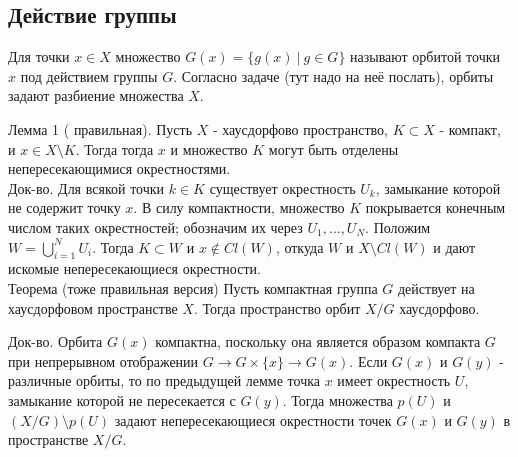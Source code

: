 \subsection{Действие группы}


Для точки $x\in X$ множество $G(x) = \{g(x)\ |\ g\in G\}$ называют орбитой точки $x$ под действием группы $G.$
Согласно задаче (тут надо на неё послать), орбиты задают разбиение множества $X.$ \


Лемма 1 ( правильная).  Пусть $X$ - хаусдорфово пространство, $K\subset X$ - компакт, и $x\in X\setminus K.$ Тогда тогда $x$ и множество $K$ могут быть отделены непересекающимися окрестностями.\\

Док-во. Для всякой точки $k\in K$ существует окрестность $U_{k}$, замыкание которой не содержит точку $x.$ В силу компактности, множество $K$ покрывается конечным числом таких окрестностей; обозначим их
через $U_{1},\ldots, U_{N}$. Положим $W = \bigcup_{i=1}^{N} U_{i}$. Тогда $K\subset W$ и $x\notin Cl(W)$, откуда $W$ и $X\setminus Cl(W)$ и дают искомые непересекающиеся окрестности.\\



Теорема (тоже правильная версия) Пусть компактная группа $G$ действует на хаусдорфовом пространстве $X.$
Тогда пространство орбит $X/G$ хаусдорфово.

Док-во.  Орбита $G(x)$ компактна, поскольку она является образом компакта $G$ при непрерывном отображении
$G \to G\times \{x\} \to G(x).$ Если $G(x)$ и $G(y)$ - различные орбиты, то по предыдущей лемме точка $x$ имеет окрестность $U$, замыкание которой не пересекается с $G(y).$
Тогда множества $p(U)$ и $(X/G) \setminus p(U)$ задают непересекающиеся окрестности точек $G(x)$ и $G(y)$ в пространстве $X/G.$


